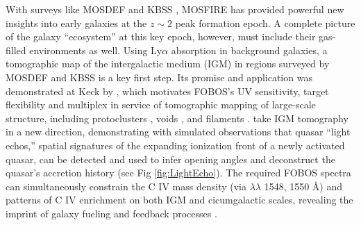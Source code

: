 With surveys like MOSDEF \citep{kriek15} and KBSS \citep[e.g.,][]{steidel14}, MOSFIRE has provided powerful new
insights into early galaxies at the $z \sim 2$ peak formation epoch.  A complete picture of the galaxy ``ecosystem'' at
this key epoch, however, must include their gas-filled environments as well.  Using Ly$\alpha$ absorption in background
galaxies, a tomographic map of the intergalactic medium (IGM) in regions surveyed by MOSDEF and KBSS is a key first
step. Its promise and application was demonstrated at Keck by \citet{lee14}, which motivates FOBOS's UV sensitivity,
target flexibility and multiplex in service of tomographic mapping of large-scale structure, including protoclusters
\citep{lee16}, voids \citep{krolewski18}, and filaments \citep{horowitz19}.  \citet{2018arXiv181005156S} take IGM
tomography in a new direction, demonstrating with simulated observations that quasar ``light echos,'' spatial
signatures of the expanding ionization front of a newly activated quasar, can be detected and used to infer opening
angles and deconstruct the quasar's accretion history (see Fig \ref{fig:LightEcho}).  The required FOBOS spectra can simultaneously constrain the C IV mass density (via $\lambda\lambda$ 1548, 1550 \AA) and patterns of C IV enrichment on both IGM and cicumgalactic scales, revealing the imprint of galaxy fueling and feedback processes \citep[e.g.,][]{tumlinson17}.







